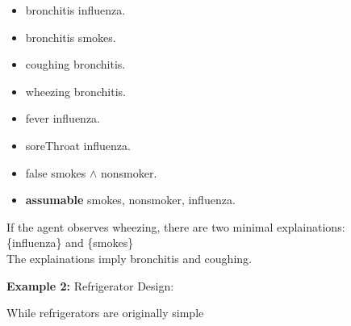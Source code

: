 \documentclass[12pt,twoside]{article}
\begin{document}
\begin{exercises}
\begin{itemize}
  \setlength{\parskip}{0pt}
  \item bronchitis \leftarrow influenza.
  \item bronchitis \leftarrow smokes.
  \item coughing \leftarrow bronchitis.
  \item wheezing \leftarrow bronchitis.
  \item fever \leftarrow influenza.
  \item soreThroat \leftarrow influenza.
  \item false \leftarrow smokes $\wedge$ nonsmoker.
  \item \textbf{assumable} smokes, nonsmoker, influenza.
\end{itemize}

If the agent observes wheezing, there are two minimal explainations: \\
\vspace{5em} \{influenza\} and \{smokes\} \\
The explainations imply bronchitis and coughing.

\textbf{Example 2:} Refrigerator Design:

While refrigerators are originally simple


\fi


\end{exercises}
\end{document}
